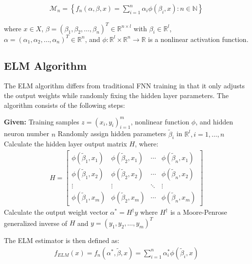 \documentclass[11pt]{article}
\begin{document}
\begin{align}
\mathcal{M}_n = \left\{f_n(\alpha, \beta, x) = \sum_{i=1}^n \alpha_i \phi(\beta_i, x): n \in \mathbb{N}\right\}
\end{align}

where $x \in X$, $\beta = (\beta_1, \beta_2, \ldots, \beta_n)^T \in \mathbb{R}^{n \times l}$ with $\beta_i \in \mathbb{R}^l$, $\alpha = (\alpha_1, \alpha_2, \ldots, \alpha_n)^T \in \mathbb{R}^n$, and $\phi: \mathbb{R}^l \times \mathbb{R}^n \rightarrow \mathbb{R}$ is a nonlinear activation function.

\subsection{ELM Algorithm}

The ELM algorithm differs from traditional FNN training in that it only adjusts the output weights while randomly fixing the hidden layer parameters. The algorithm consists of the following steps:

\begin{algorithm}
\caption{Standard ELM Algorithm}
\begin{algorithmic}[1]
\State \textbf{Given:} Training samples $z = (x_i, y_i)_{i=1}^m$, nonlinear function $\phi$, and hidden neuron number $n$
\State Randomly assign hidden parameters $\tilde{\beta}_i$ in $\mathbb{R}^l, i = 1, \ldots, n$
\State Calculate the hidden layer output matrix $H$, where:
\begin{align*}
H = \begin{bmatrix}
\phi(\tilde{\beta}_1, x_1) & \phi(\tilde{\beta}_2, x_1) & \cdots & \phi(\tilde{\beta}_n, x_1) \\
\phi(\tilde{\beta}_1, x_2) & \phi(\tilde{\beta}_2, x_2) & \cdots & \phi(\tilde{\beta}_n, x_2) \\
\vdots & \vdots & \ddots & \vdots \\
\phi(\tilde{\beta}_1, x_m) & \phi(\tilde{\beta}_2, x_m) & \cdots & \phi(\tilde{\beta}_n, x_m)
\end{bmatrix}
\end{align*}
\State Calculate the output weight vector $\alpha^* = H^\dagger y$ where $H^\dagger$ is a Moore-Penrose generalized inverse of $H$ and $y = (y_1, y_2, \ldots, y_m)^T$
\end{algorithmic}
\end{algorithm}

The ELM estimator is then defined as:
\begin{align}
f_{ELM}(x) = f_n(\alpha^*, \tilde{\beta}, x) = \sum_{i=1}^n \alpha_i^* \phi(\tilde{\beta}_i, x)
\end{align}
\end{document}
